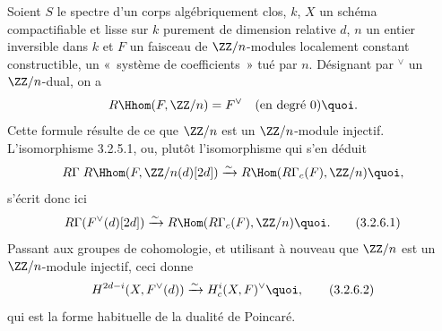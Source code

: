 \setcounter{subsubsection}{5}
\subsubsection{}
Soient $S$ le spectre d'un corps algébriquement clos, $k$, $X$ un
schéma compactifiable et lisse sur $k$ purement de dimension relative
$d$, $n$ un entier inversible dans $k$ et $F$ un faisceau de
$\ZZ/n$-modules localement constant constructible, \ie un « système de coefficients »  tué par $n$. Désignant par
${}^\vee$ un $\ZZ/n$-dual, on a
$$
R\Hhom(F,\ZZ/n)=F^{\vee}\quad\text{\rm (en degré 0)}{\quoi}.
$$
Cette formule résulte de ce que $\ZZ/n$ est un
$\ZZ/n$-module injectif. L'isomorphisme 3.2.5.1, ou, plutôt
l'isomorphisme qui s'en déduit
$$
R\Gamma\;R\Hhom(F,\ZZ/n(d)[2d])\xrightarrow{\sim}
R\Hom(R\Gamma_{c}(F),\ZZ/n){\quoi},
$$
s'écrit donc ici
\begin{equation*}
R\Gamma (F^{\vee}(d)[2d])\xrightarrow{\sim} R\Hom
(R\Gamma_{c}(F),\ZZ/n){\quoi}.\tag{3.2.6.1}
\end{equation*}%
Passant aux groupes de cohomologie, et utilisant à nouveau que
$\ZZ/n$ est un $\ZZ/n$-module injectif, ceci donne
\begin{equation*}
H^{2d-i}(X,F^{\vee}(d))\xrightarrow{\sim}H^{i}_{c}(X,F)^{\vee}{\quoi},\tag{3.2.6.2}
\end{equation*}%
qui est la forme habituelle de la dualité de Poincaré.

